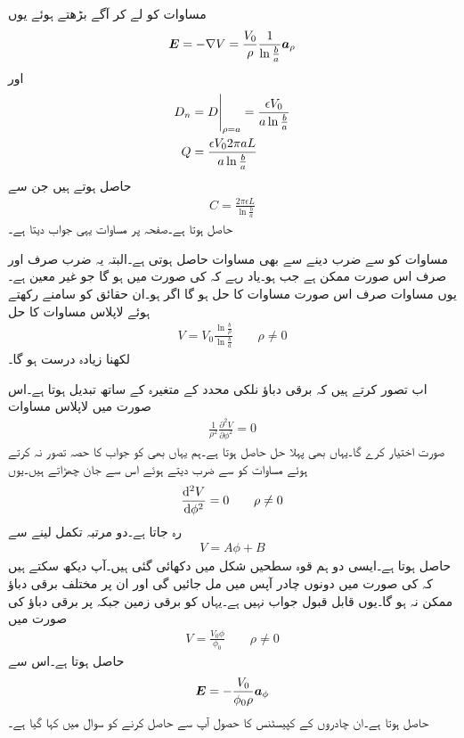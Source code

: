 مساوات  کو لے کر آگے بڑھتے ہوئے یوں
\begin{align*}
{\ensuremath{{\boldsymbol{E}}}}=-\nabla V=\frac{V_0}{\rho} \frac{1}{\ln \frac{b}{a}} {\boldsymbol{a}}_{\rho}
\end{align*}
اور
\begin{align*}
D_n&=\eval{D}_{\rho=a}=\frac{\epsilon V_0}{a\ln \frac{b}{a}}\\
Q&=\frac{\epsilon V_0 2 \pi a L}{a \ln \frac{b}{a}}
\end{align*}
حاصل ہوتے ہیں جن سے
\begin{align}
C=\frac{2\pi \epsilon L}{\ln \frac{b}{a}}
\end{align}
حاصل ہوتا ہے۔صفحہ  پر مساوات  یہی جواب دیتا ہے۔

مساوات  کو  سے ضرب دینے سے بھی مساوات  حاصل ہوتی ہے۔البتہ یہ ضرب صرف اور صرف اس صورت ممکن ہے جب  ہو۔یاد رہے کہ  کی صورت میں  ہو گا جو غیر معین ہے۔یوں  مساوات  صرف اس صورت مساوات  کا حل ہو گا اگر  ہو۔ان حقائق کو سامنے رکھتے ہوئے لاپلاس مساوات کا حل
\begin{align}
V=V_0 \frac{\ln \frac{b}{\rho} }{\ln \frac{b}{a} } \quad \quad \rho \ne 0
\end{align}
لکھنا زیادہ درست ہو گا۔

اب تصور کرتے ہیں کہ برقی دباؤ نلکی محدد کے متغیرہ  کے ساتھ تبدیل ہوتا ہے۔اس صورت میں لاپلاس مساوات
\begin{align*}
\frac{1}{\rho^2}\frac{\partial^2 V}{\partial \phi^2}=0
\end{align*}
صورت اختیار کرے گا۔یہاں بھی پہلا حل  حاصل ہوتا ہے۔ہم یہاں بھی  کو جواب کا حصہ تصور نہ کرتے ہوئے مساوات کو  سے ضرب دیتے ہوئے اس سے جان چھڑاتے ہیں۔یوں
\begin{align*}
\frac{\dif{^2} V}{\dif \phi^2}=0   \quad \quad \rho \ne 0
\end{align*}
رہ جاتا ہے۔دو مرتبہ تکمل لینے سے
\begin{align*}
V=A \phi+B
\end{align*}
حاصل ہوتا ہے۔ایسی دو ہم قوہ سطحیں شکل میں دکھائی گئی ہیں۔آپ دیکھ سکتے ہیں کہ  کی صورت میں دونوں چادر آپس میں مل جائیں گی اور ان پر مختلف برقی دباؤ ممکن نہ ہو گا۔یوں  قابل قبول جواب نہیں ہے۔یہاں  کو برقی زمین جبکہ  پر  برقی دباؤ کی صورت میں
\begin{align}
V=\frac{V_0\phi}{\phi_0}  \quad \quad \rho \ne 0
\end{align}
حاصل ہوتا ہے۔اس سے
\begin{align*}
{\ensuremath{{\boldsymbol{E}}}}=-\frac{V_0}{\phi_0 \rho}{\boldsymbol{a}}_{\phi}
\end{align*}
حاصل ہوتا ہے۔ان چادروں کے کپیسٹنس کا حصول آپ سے حاصل کرنے کو سوال میں کہا گیا ہے۔

